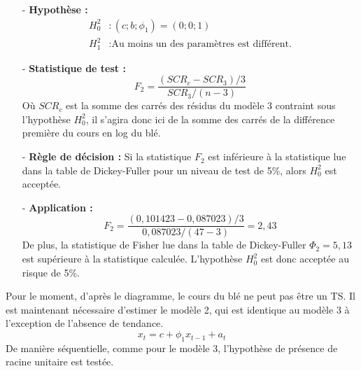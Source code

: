 \begin{itemize}
\item[-]\textbf{Hypothèse :} 
\begin{equation*}
    \begin{split}
        H_{0}^{2} &: (c; b; \phi_{1}) = (0;0;1)\\
        H_{1}^{2} &: \text{Au moins un des paramètres est différent.}
    \end{split}
\end{equation*}
\item[-]\textbf{Statistique de test :}
\begin{equation*}
    F_{2} = \frac{(SCR_{c} - SCR_{3})/3}{SCR_{3}/(n-3)}
\end{equation*}
Où $SCR_{c}$ est la somme des carrés des résidus du modèle 3 contraint sous l'hypothèse $H_{0}^{2}$, il s'agira donc ici de la somme des carrés de la différence première
du cours en log du blé.
\item[-]\textbf{Règle de décision :}  Si la statistique $F_{2}$ est inférieure à la statistique lue dans la table de Dickey-Fuller pour un niveau de test de 5\%, alors $H_{0}^{2}$ est acceptée.
\item[-]\textbf{Application :} 
\begin{equation*}
    F_{2} = \frac{(0,101423 - 0,087023)/3}{0,087023/(47-3)} = 2,43
\end{equation*}
De plus, la statistique de Fisher lue dans la table de Dickey-Fuller $\Phi_{2} = 5,13$ est supérieure à la statistique calculée. L'hypothèse $H_{0}^{2}$ est donc acceptée
au risque de 5\%. 
\end{itemize}
%
Pour le moment, d'après le diagramme, le cours du blé ne peut pas être un TS. Il est maintenant nécessaire d'estimer le modèle 2, qui est identique au modèle 3 à 
l'exception de l'absence de tendance.
\begin{equation*}
    x_{t} = c + \phi_{1} x_{t-1} + a_{t}
\end{equation*}
De manière séquentielle, comme pour le modèle 3, l'hypothèse de présence de racine unitaire est testée.
%
